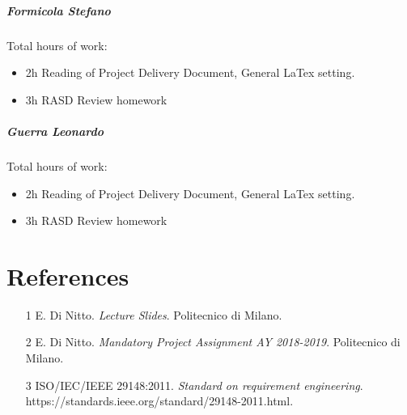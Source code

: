 \documentclass{report}
\newcommand{\ic}[1]{\textit{#1}}
\begin{document}
		\paragraph{Formicola Stefano} Total hours of work: 
			\begin{itemize}
				\item 2h Reading of Project Delivery Document, General LaTex setting.
				\item 3h RASD Review homework

			\end{itemize}
		\paragraph{Guerra Leonardo} Total hours of work: 
			\begin{itemize}
				\item 2h Reading of Project Delivery Document, General LaTex setting.
				\item 3h RASD Review homework
				
			\end{itemize}
	\chapter{References}
	\thispagestyle{fancy}
	\begin{itemize}
				\item[1]E. Di Nitto. \ic{Lecture Slides}. Politecnico di Milano.
				\item[2]E. Di Nitto. \ic{Mandatory Project Assignment AY 2018-2019}. Politecnico di Milano.
				\item[3]ISO/IEC/IEEE 29148:2011. \ic{Standard on requirement engineering}.\\https://standards.ieee.org/standard/29148-2011.html.
	\end{itemize}
	
\end{document}
